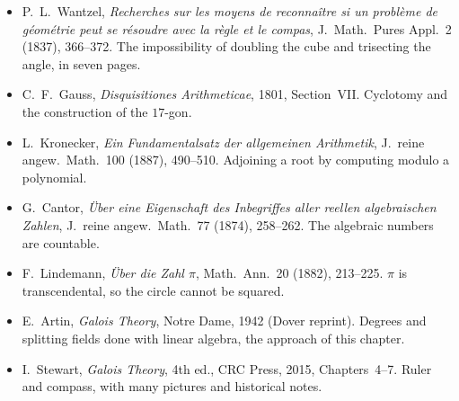\begin{itemize}
\item P.~L.~Wantzel, \emph{Recherches sur les moyens de reconnaître si un problème de géométrie peut se résoudre avec la règle et le compas}, J.\ Math.\ Pures Appl.\ 2 (1837), 366--372. The impossibility of doubling the cube and trisecting the angle, in seven pages.
\item C.~F.~Gauss, \emph{Disquisitiones Arithmeticae}, 1801, Section~VII. Cyclotomy and the construction of the $17$-gon.
\item L.~Kronecker, \emph{Ein Fundamentalsatz der allgemeinen Arithmetik}, J.\ reine angew.\ Math.\ 100 (1887), 490--510. Adjoining a root by computing modulo a polynomial.
\item G.~Cantor, \emph{Über eine Eigenschaft des Inbegriffes aller reellen algebraischen Zahlen}, J.\ reine angew.\ Math.\ 77 (1874), 258--262. The algebraic numbers are countable.
\item F.~Lindemann, \emph{Über die Zahl $\pi$}, Math.\ Ann.\ 20 (1882), 213--225. $\pi$ is transcendental, so the circle cannot be squared.
\item E.~Artin, \emph{Galois Theory}, Notre Dame, 1942 (Dover reprint). Degrees and splitting fields done with linear algebra, the approach of this chapter.
\item I.~Stewart, \emph{Galois Theory}, 4th ed., CRC Press, 2015, Chapters~4--7. Ruler and compass, with many pictures and historical notes.
\end{itemize}

